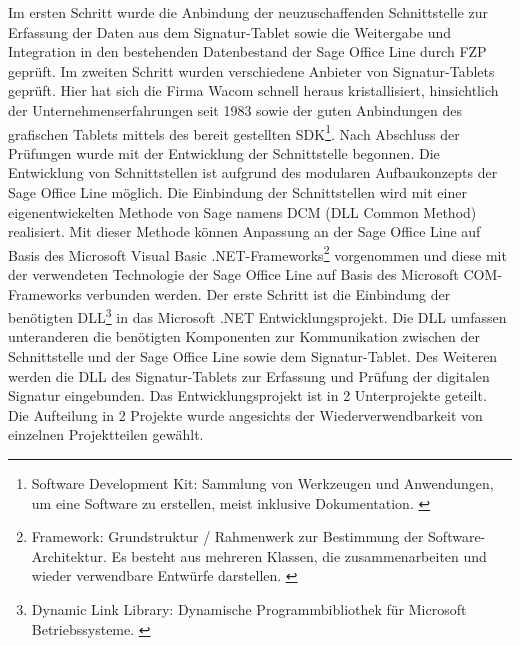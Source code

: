 Im ersten Schritt wurde die Anbindung der neuzuschaffenden Schnittstelle zur Erfassung der Daten aus dem Signatur-Tablet sowie die 
Weitergabe und Integration in den bestehenden Datenbestand der Sage Office Line durch FZP geprüft. Im zweiten Schritt wurden verschiedene
Anbieter von Signatur-Tablets geprüft. Hier hat sich die Firma Wacom schnell heraus kristallisiert, hinsichtlich der Unternehmenserfahrungen seit 1983 \cite{konzept1} sowie der guten Anbindungen des grafischen Tablets mittels des bereit gestellten SDK\footnote{\label{foot:4}Software Development Kit: Sammlung von Werkzeugen und Anwendungen, um eine Software zu erstellen, meist inklusive Dokumentation. \cite{SDK}}. Nach Abschluss der Prüfungen wurde mit der Entwicklung der Schnittstelle begonnen.
\newline
Die Entwicklung von Schnittstellen ist aufgrund des modularen Aufbaukonzepts der Sage Office Line möglich. Die Einbindung der Schnittstellen wird mit einer eigenentwickelten Methode von Sage namens DCM (DLL Common Method) realisiert. Mit dieser Methode können Anpassung an der Sage Office Line auf Basis des Microsoft Visual Basic .NET-Frameworks\footnote{\label{foot:5}Framework: Grundstruktur / Rahmenwerk zur Bestimmung der 
Software-Architektur. Es besteht aus mehreren Klassen, die zusammenarbeiten und wieder verwendbare Entwürfe darstellen. \cite{framework}}
vorgenommen und diese mit der verwendeten Technologie der Sage Office Line auf Basis des Microsoft COM-Frameworks verbunden werden.
\newline
Der erste Schritt ist die Einbindung der benötigten DLL\footnote{\label{foot:6}Dynamic Link Library: Dynamische Programmbibliothek für Microsoft Betriebssysteme. \cite{DLL}} in das Microsoft .NET Entwicklungsprojekt. Die DLL umfassen unteranderen die benötigten Komponenten zur Kommunikation zwischen der Schnittstelle und der Sage Office Line sowie dem Signatur-Tablet. Des Weiteren werden die DLL des Signatur-Tablets zur Erfassung und Prüfung der digitalen Signatur eingebunden. Das Entwicklungsprojekt ist in 2 Unterprojekte geteilt. Die Aufteilung in 2 Projekte wurde angesichts der Wiederverwendbarkeit von einzelnen Projektteilen gewählt.
\newline
